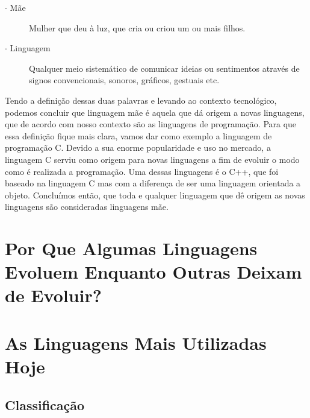 \documentclass[
    12pt,               %
    openany,            %
    twoside,            %
    a4paper,            %
    brazil              %
    ]{abntex2}
\begin{document}
\begin{description} \item[$\cdot$ Mãe] Mulher que deu à luz, que cria ou criou
um ou mais filhos.  \item[$\cdot$ Linguagem] Qualquer meio sistemático de
comunicar ideias ou sentimentos através de signos convencionais, sonoros,
gráficos, gestuais etc.
\end{description}

Tendo a definição dessas duas palavras e levando ao contexto tecnológico,
podemos concluir que linguagem mãe é aquela que dá origem a novas linguagens,
que de acordo com nosso contexto são as linguagens de programação.  Para que
essa definição fique mais clara, vamos dar como exemplo a linguagem de
programação C. Devido a sua enorme popularidade e uso no mercado, a linguagem C
serviu como origem para novas linguagens a fim de evoluir o modo como é
realizada a programação. Uma dessas linguagens é o C++, que foi baseado na
linguagem C mas com a diferença de ser uma linguagem orientada a objeto.
Concluímos então, que toda e qualquer linguagem que dê origem as novas
linguagens são consideradas linguagens mãe.

\chapter{Por Que Algumas Linguagens Evoluem Enquanto Outras Deixam de Evoluir?}

\chapter{As Linguagens Mais Utilizadas Hoje}

\section{Classificação}
\end{document}
